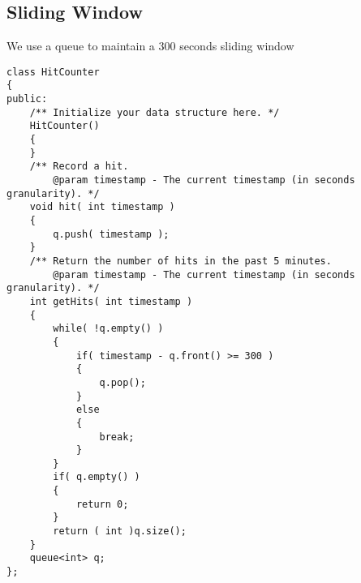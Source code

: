\subsection{Sliding Window}
We use a queue to maintain a 300 seconds sliding window

\setcounter{lstlisting}{0}
\begin{lstlisting}[style=customc, caption={Sliding Window}]
class HitCounter
{
public:
    /** Initialize your data structure here. */
    HitCounter()
    {
    }
    /** Record a hit.
        @param timestamp - The current timestamp (in seconds granularity). */
    void hit( int timestamp )
    {
        q.push( timestamp );
    }
    /** Return the number of hits in the past 5 minutes.
        @param timestamp - The current timestamp (in seconds granularity). */
    int getHits( int timestamp )
    {
        while( !q.empty() )
        {
            if( timestamp - q.front() >= 300 )
            {
                q.pop();
            }
            else
            {
                break;
            }
        }
        if( q.empty() )
        {
            return 0;
        }
        return ( int )q.size();
    }
    queue<int> q;
};
\end{lstlisting}